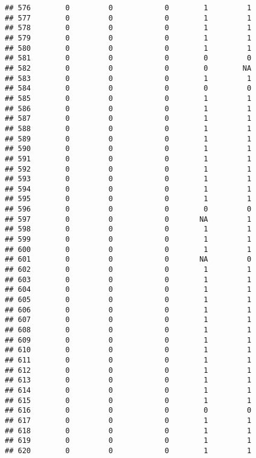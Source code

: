 \documentclass[
]{article}
\begin{document}
\begin{verbatim}
## 576        0         0            0        1         1
## 577        0         0            0        1         1
## 578        0         0            0        1         1
## 579        0         0            0        1         1
## 580        0         0            0        1         1
## 581        0         0            0        0         0
## 582        0         0            0        0        NA
## 583        0         0            0        1         1
## 584        0         0            0        0         0
## 585        0         0            0        1         1
## 586        0         0            0        1         1
## 587        0         0            0        1         1
## 588        0         0            0        1         1
## 589        0         0            0        1         1
## 590        0         0            0        1         1
## 591        0         0            0        1         1
## 592        0         0            0        1         1
## 593        0         0            0        1         1
## 594        0         0            0        1         1
## 595        0         0            0        1         1
## 596        0         0            0        0         0
## 597        0         0            0       NA         1
## 598        0         0            0        1         1
## 599        0         0            0        1         1
## 600        0         0            0        1         1
## 601        0         0            0       NA         0
## 602        0         0            0        1         1
## 603        0         0            0        1         1
## 604        0         0            0        1         1
## 605        0         0            0        1         1
## 606        0         0            0        1         1
## 607        0         0            0        1         1
## 608        0         0            0        1         1
## 609        0         0            0        1         1
## 610        0         0            0        1         1
## 611        0         0            0        1         1
## 612        0         0            0        1         1
## 613        0         0            0        1         1
## 614        0         0            0        1         1
## 615        0         0            0        1         1
## 616        0         0            0        0         0
## 617        0         0            0        1         1
## 618        0         0            0        1         1
## 619        0         0            0        1         1
## 620        0         0            0        1         1

\end{verbatim}
\end{document}

